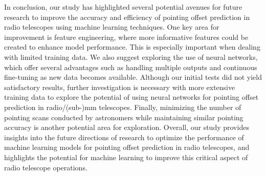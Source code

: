 In conclusion, our study has highlighted several potential avenues for future research to improve the accuracy and efficiency of pointing offset prediction in radio telescopes using machine learning techniques.
One key area for improvement is feature engineering, where more informative features could be created to enhance model performance.
This is especially important when dealing with limited training data.
We also suggest exploring the use of neural networks, which offer several advantages such as handling multiple outputs and continuous fine-tuning as new data becomes available.
Although our initial tests did not yield satisfactory results,
further investigation is necessary with more extensive training data to explore the potential of using neural networks for pointing offset prediction in radio/(sub-)mm telescopes.
Finally, minimizing the number of pointing scans conducted by astronomers while maintaining similar pointing accuracy is another potential area for exploration.
Overall, our study provides insights into the future directions of research to optimize the performance of machine learning models for pointing offset prediction in radio telescopes,
and highlights the potential for machine learning to improve this critical aspect of radio telescope operations.